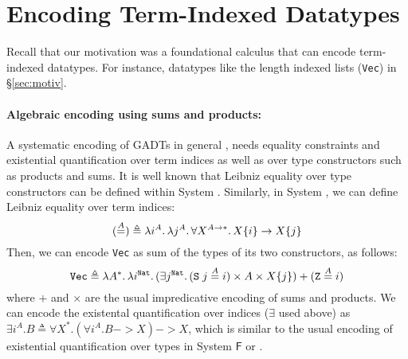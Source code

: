 \section{Encoding Term-Indexed Datatypes} \label{sec:data}
Recall that our motivation was a foundational calculus
that can encode term-indexed datatypes. For instance, 
datatypes like the length indexed lists ({\small\tt Vec}) in \S\ref{sec:motiv}.

\paragraph{Algebraic encoding using sums and products:}

A systematic encoding of GADTs in general
\cite{Sheard04equality,crary98intensional},
needs equality constraints and existential quantification
over term indices as well as over type constructors such as products and sums.
It is well known that Leibniz equality over type constructors
can be defined within System \Fw. %
Similarly, in System \Fi, we can define Leibniz equality over term indices:
\[
(\stackrel{A}{=}) \triangleq
        \lambda i^A.\, \lambda j^A.\, \forall X^{A\to*}.\, X\{i\}\to X\{j\}
\]
Then, we can encode {\small\tt Vec} as sum of the types of its two constructors,
as follows:
\[ \mathtt{Vec} \triangleq \lambda A^{*}.\,\lambda i^\texttt{Nat}.\,
        (\exists j^\texttt{Nat}.\,(\texttt{S}\;j\stackrel{A}{=}i)\times A \times X\{j\})
        +
        (\texttt{Z}\stackrel{A}{=}i)
\]
where $+$ and $\times$ are the usual impredicative encoding of sums
and products. We can encode the existental quantification over indices
($\exists$ used above) as
$ \exists i^A.B \triangleq \forall X^{*}. (\forall i^A.B -> X) -> X $,
which is similar to the usual encoding of existential quantification
over types in System $\mathsf{F}$ or \Fw.

